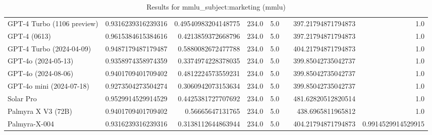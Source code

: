 \begin{table}[htp]
{\begin{tabular}{lrrrrrrr}
GPT-4 Turbo (1106 preview) & 0.9316239316239316 & 0.49540983204148775 & 234.0 & 5.0 &  & 397.21794871794873 & 1.0 \\
GPT-4 (0613) & 0.9615384615384616 & 0.4213859372668796 & 234.0 & 5.0 &  & 397.21794871794873 & 1.0 \\
GPT-4 Turbo (2024-04-09) & 0.9487179487179487 & 0.5880082672477788 & 234.0 & 5.0 &  & 404.21794871794873 & 1.0 \\
GPT-4o (2024-05-13) & 0.9358974358974359 & 0.3374974228378035 & 234.0 & 5.0 &  & 399.85042735042737 & 1.0 \\
GPT-4o (2024-08-06) & 0.9401709401709402 & 0.4812224573559231 & 234.0 & 5.0 &  & 399.85042735042737 & 1.0 \\
GPT-4o mini (2024-07-18) & 0.9273504273504274 & 0.3060942073153634 & 234.0 & 5.0 &  & 399.85042735042737 & 1.0 \\
Solar Pro & 0.9529914529914529 & 0.4425381727707692 & 234.0 & 5.0 &  & 481.62820512820514 & 1.0 \\
Palmyra X V3 (72B) & 0.9401709401709402 & 0.56665647131765 & 234.0 & 5.0 &  & 438.6965811965812 & 1.0 \\
Palmyra-X-004 & 0.9316239316239316 & 0.3138112644863944 & 234.0 & 5.0 &  & 404.21794871794873 & 0.9914529914529915 \\
\bottomrule
\end{tabular}}
\caption{Results for mmlu_subject:marketing (mmlu)}
\label{fig:mmlu_subject:marketing (mmlu)}
\end{table}